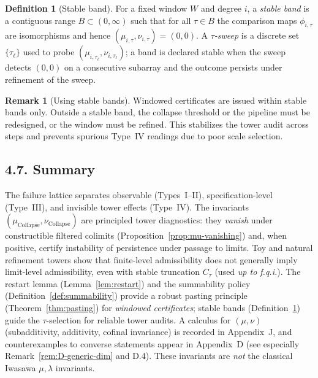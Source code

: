 \documentclass[11pt]{article}
\numberwithin{equation}{section}
\theoremstyle{definition}
\newtheorem{definition}[theorem]{Definition}
\newtheorem{remark}[theorem]{Remark}
\DeclareRobustCommand{\muc}{\mu_{\mathrm{Collapse}}}
\DeclareRobustCommand{\nuc}{\nu_{\mathrm{Collapse}}}
\begin{document}
\begin{definition}[Stable band]\label{def:stable-band}
For a fixed window $W$ and degree $i$, a \emph{stable band} is a contiguous range $B\subset (0,\infty)$ such that for all $\tau\in B$ the comparison maps $\phi_{i,\tau}$ are isomorphisms and hence $(\mu_{i,\tau},\nu_{i,\tau})=(0,0)$. A \emph{$\tau$-sweep} is a discrete set $\{\tau_\ell\}$ used to probe $(\mu_{i,\tau_\ell},\nu_{i,\tau_\ell})$; a band is declared stable when the sweep detects $(0,0)$ on a consecutive subarray and the outcome persists under refinement of the sweep.
\end{definition}

\begin{remark}[Using stable bands]
Windowed certificates are issued within stable bands only. Outside a stable band, the collapse threshold or the pipeline must be redesigned, or the window must be refined. This stabilizes the tower audit across steps and prevents spurious Type~IV readings due to poor scale selection.
\end{remark}

\subsection*{4.7. Summary}
The failure lattice separates observable (Types~I–II), specification-level (Type~III), and invisible tower effects (Type~IV). The invariants $(\muc,\nuc)$ are principled tower diagnostics: they \emph{vanish} under constructible filtered colimits (Proposition~\ref{prop:mu-vanishing}) and, when positive, certify instability of persistence under passage to limits. Toy and natural refinement towers show that finite-level admissibility does not generally imply limit-level admissibility, even with stable truncation $C_\tau$ (used \emph{up to f.q.i.}). The restart lemma (Lemma~\ref{lem:restart}) and the summability policy (Definition~\ref{def:summability}) provide a robust pasting principle (Theorem~\ref{thm:pasting}) for \emph{windowed certificates}; stable bands (Definition~\ref{def:stable-band}) guide the $\tau$-selection for reliable tower audits. A calculus for $(\mu,\nu)$ (subadditivity, additivity, cofinal invariance) is recorded in Appendix~J, and counterexamples to converse statements appear in Appendix~D (see especially Remark~\ref{rem:D-generic-dim} and D.4). These invariants are \emph{not} the classical Iwasawa $\mu,\lambda$ invariants.



\end{document}
